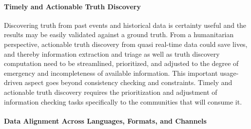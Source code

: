 \documentclass[prodmode,acmtecs]{acmsmall} %
\begin{document}
\paragraph*{Timely and Actionable Truth Discovery} 
Discovering truth from past events and historical data is certainty
useful and the results may be easily validated against a ground truth.
From a humanitarian perspective, actionable truth discovery 
from quasi real-time data could save lives, and thereby information extraction and triage as well
as truth discovery computation need to be streamlined, prioritized,  and adjusted to the degree of emergency 
and incompleteness of available information. This important usage-driven aspect goes beyond consistency checking and constraints. 
Timely and actionable truth discovery requires the prioritization and adjustment of information checking tasks specifically
to the communities that will consume it.


%

\paragraph*{Data Alignment Across Languages, Formats, and Channels} 
\end{document}
